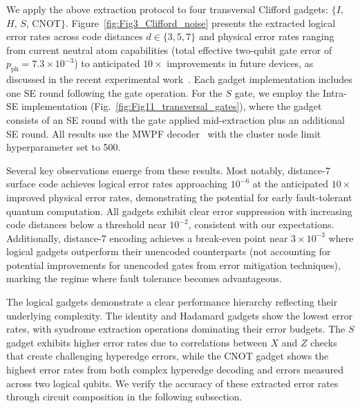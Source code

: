 \documentclass[aps, prx, reprint, superscriptaddress, longbibliography, floatfix]{revtex4-2}
\begin{document}
We apply the above extraction protocol to four transversal Clifford gadgets: $\{I$, $H$, $S$, CNOT$\}$. Figure~\ref{fig:Fig3_Clifford_noise} presents the extracted logical error rates across code distances $d \in \{3,5,7\}$ and physical error rates ranging from current neutral atom capabilities (total effective two-qubit gate error of $p_{\mathrm{ph}} = 7.3 \times 10^{-3}$) to anticipated $10\times$ improvements in future devices, as discussed in the recent experimental work~\cite{Bluvstein2025b}. Each gadget implementation includes one SE round following the gate operation. For the $S$ gate, we employ the Intra-SE implementation (Fig.~\ref{fig:Fig11_transversal_gates}), where the gadget consists of an SE round with the gate applied mid-extraction plus an additional SE round. All results use the MWPF decoder~\cite{wu2025mwpf} with the cluster node limit hyperparameter set to 500.

Several key observations emerge from these results. Most notably, distance-7 surface code achieves logical error rates approaching $10^{-6}$ at the anticipated $10\times$ improved physical error rates, demonstrating the potential for early fault-tolerant quantum computation. All gadgets exhibit clear error suppression with increasing code distances below a threshold near $10^{-2}$, consistent with our expectations. Additionally, distance-7 encoding achieves a break-even point near $3 \times 10^{-3}$ where logical gadgets outperform their unencoded counterparts (not accounting for potential improvements for unencoded gates from error mitigation techniques), marking the regime where fault tolerance becomes advantageous.

The logical gadgets demonstrate a clear performance hierarchy reflecting their underlying complexity. The identity and Hadamard gadgets show the lowest error rates, with syndrome extraction operations dominating their error budgets. The $S$ gadget exhibits higher error rates due to correlations between $X$ and $Z$ checks that create challenging hyperedge errors, while the CNOT gadget shows the highest error rates from both complex hyperedge decoding and errors measured across two logical qubits. We verify the accuracy of these extracted error rates through circuit composition in the following subsection.
\end{document}
